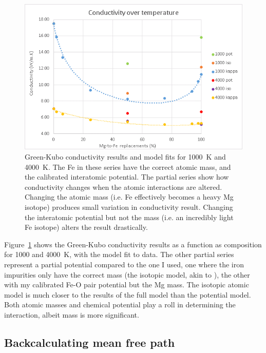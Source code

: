 \begin{figure}[h!]
  \includegraphics[width=\linewidth]{Figures/kc_iso_pot_full.png}
  \caption[kc iso pot full]{Green-Kubo conductivity results and model fits for 1000~K and 4000~K. The Fe in these series have the correct atomic mass, and the calibrated interatomic potential. The partial series show how conductivity changes when the atomic interactions are altered. Changing the atomic mass (i.e. Fe effectively becomes a heavy Mg isotope) produces small variation in conductivity result. Changing the interatomic potential but not the mass (i.e. an incredibly light Fe isotope) alters the result drastically.}
  \label{kc_iso_pot_full}
\end{figure}

Figure~\ref{kc_iso_pot_full} shows the Green-Kubo conductivity results as a function as composition for 1000 and 4000~K, with the model fit to data. The other partial series represent a partial potential compared to the one I used, one where the iron impurities only have the correct mass (the isotopic model, akin to \citet{Ammann2014}), the other with my calibrated Fe-O pair potential but the Mg mass. The isotopic atomic model is much closer to the results of the full model than the potential model. Both atomic masses and chemical potential play a roll in determining the interaction, albeit mass is more significant. 



\subsection{Backcalculating mean free path}

